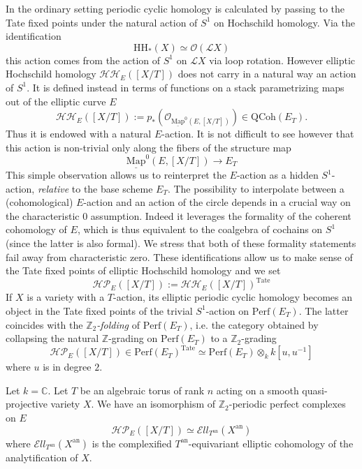 \documentclass[11pt,letterpaper]{amsart}
\newenvironment{customthm}[1]
{\renewcommand\theinnercustomthm{#1}\innercustomthm}
  {\endinnercustomthm}
\newcommand{\bC}{\mathbb{C}}
\newcommand{\bZ}{\mathbb{Z}}
\newcommand{\cO}{\mathcal{O}}
\newcommand{\cL}{\mathcal{L}}
\newcommand{\cHP}{\mathcal{HP}}
\newcommand{\Mapo}[2]{\underline{\mathrm{Map}}^{0}\left (#1,#2\right )}
\newcommand{\El}{\mathcal{E}ll}
\newcommand{\an}{\mathrm{an}}
\newcommand{\Perf}{\mathrm{Perf}}
\newcommand{\QCoh}{\mathrm{QCoh}}
\begin{document}
In the ordinary setting periodic cyclic homology is calculated by passing to the Tate fixed points under  the natural action of $S^1$ on Hochschild homology.  Via the identification 
 $$
\mathrm{HH}_*(X) \simeq \cO(\cL X)
$$
this action comes from the action of $S^1$ on $\cL X$ via  loop rotation. 
However elliptic Hochschild homology $\mathcal{HH}_E([X/T])$ does not carry in a natural way an  action of $S^1$.  It is defined instead in terms of functions on a  stack parametrizing maps out of the elliptic curve $E$
$$
\mathcal{HH}_E([X/T]):=p_*(\mathcal{O}_{\Mapo{E}{[X/T]}}) \in \QCoh(E_T
). 
$$
Thus it is endowed with a natural $E$-action. It is not difficult to see however  that this action is non-trivial only along the fibers of the structure map 
$$
\Mapo{E}{[X/T]} \to E_T
$$
This simple observation allows us to reinterpret the $E$-action as a hidden $S^1$-action, \emph{relative} to the base scheme $E_T$. The possibility to interpolate between a (cohomological) $E$-action and an action of the circle depends in a crucial way on the characteristic 0 assumption. Indeed it leverages the formality of the coherent cohomology of $E$, which is thus   equivalent to the coalgebra of cochains on $S^1$ (since the latter is also formal). We stress that both of these   formality statements fail   away from characteristic zero.  These identifications allow us to make sense of the Tate fixed points of elliptic Hochschild homology and we set  $$
\cHP_E([X/T]):=\mathcal{HH}_E([X/T])^{\mathrm{Tate}}$$ 
If $X$ is a variety with a $T$-action, its elliptic periodic cyclic homology becomes an object in the Tate fixed points of the trivial $S^1$-action on $\Perf(E_T)$. The latter coincides with the  \emph{$\mathbb{Z}_2$-folding} of $\Perf(E_T)$, i.e. the category obtained by collapsing the natural   $\mathbb{Z}$-grading on $\Perf(E_T)$ to a $\mathbb{Z}_2$-grading
$$
\cHP_E([X/T]) \in \Perf(E_T)^{\mathrm{Tate}} \simeq \Perf(E_T) \otimes_k k[u, u^{-1}]
$$
where $u$ is in degree $2$. 

\begin{customthm}{G}[Theorem  \ref{theorem:comparisongeneral}]\label{comparisonintro}
Let $k=\bC$. Let $T$ be an algebraic torus of rank $n$ acting on a smooth quasi-projective variety $X$.
We have an isomorphism of $\bZ_2$-periodic perfect complexes on $E$
$$\cHP_E([X/T])\simeq\El_{T^{\an}}(X^{\an})$$
where $\El_{T^{\an}}(X^{\an})$  is  the complexified $T^{\an}$-equivariant elliptic cohomology of the analytification of $X$.  \end{customthm}
\end{document}

